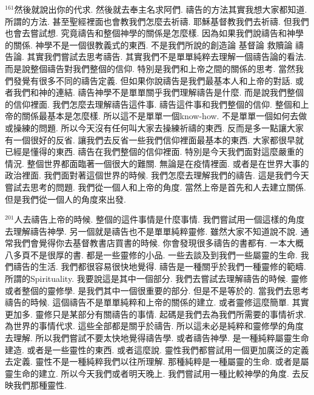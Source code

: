 \documentclass{book}
\begin{document}
$^{161}$然後就說出你的代求.
然後就去奉主名求阿們.
禱告的方法其實我想大家都知道.
所謂的方法.
甚至聖經裡面也會教我們怎麼去祈禱.
耶穌基督教我們去祈禱.
但我們也會去嘗試想.
究竟禱告和整個神學的關係是怎麼樣.
因為如果我們說禱告和神學的關係.
神學不是一個很教義式的東西.
不是我們所說的創造論 基督論 救贖論 禱告論.
其實我們嘗試去思考禱告.
其實我們不是單單純粹去理解一個禱告論的看法.
而是說整個禱告對我們整個的信仰.
特別是我們和上帝之間的關係的思考.
當然我們發覺有很多不同的禱告定義.
但如果你說禱告是我們最基本人和上帝的對話.
或者我們和神的連結.
禱告神學不是單單關乎我們理解禱告是什麼.
而是說我們整個的信仰裡面.
我們怎麼去理解禱告這件事.
禱告這件事和我們整個的信仰.
整個和上帝的關係最基本是怎麼樣.
所以這不是單單一個know-how.
不是單單一個如何去做或操練的問題.
所以今天沒有任何叫大家去操練祈禱的東西.
反而是多一點讓大家有一個很好的反省.
讓我們去反省一些我們信仰裡面最基本的東西.
大家都很早就已經是懂得的東西.
禱告在我們整個的信仰裡面.
特別是今天我們面對這麼嚴重的情況.
整個世界都面臨著一個很大的難關.
無論是在疫情裡面.
或者是在世界大事的政治裡面.
我們面對著這個世界的時候.
我們怎麼去理解我們的禱告.
這是我們今天嘗試去思考的問題.
我們從一個人和上帝的角度.
當然上帝是首先和人去建立關係.
但是我們從一個人的角度來出發.

$^{201}$人去禱告上帝的時候.
整個的這件事情是什麼事情.
我們嘗試用一個這樣的角度去理解禱告神學.
另一個就是禱告也不是單單純粹靈修.
雖然大家不知道說不說.
通常我們會覺得你去基督教書店買書的時候.
你會發現很多禱告的書都有.
一本大概八多頁不是很厚的書.
都是一些靈修的小品.
一些去談及到我們一些屬靈的生命.
我們禱告的生活.
我們都很容易很快地覺得.
禱告是一種關乎於我們一種靈修的範疇.
所謂的Spirituality.
我要說這是其中一個部分.
我們去嘗試去理解禱告的時候.
靈修或者整個的靈修學.
是我們其中一個很重要的部分.
但是不是等於的.
當我們去思考禱告的時候.
這個禱告不是單單純粹和上帝的關係的建立.
或者靈修這麼簡單.
其實更加多.
靈修只是某部分有關禱告的事情.
起碼是我們去為我們所需要的事情祈求.
為世界的事情代求.
這些全部都是關乎於禱告.
所以這未必是純粹和靈修學的角度去理解.
所以我們嘗試不要太快地覺得禱告學.
或者禱告神學.
是一種純粹屬靈生命建造.
或者是一些靈性的東西.
或者這麼說.
靈性我們都嘗試用一個更加廣泛的定義去定義.
靈性不是一種純粹我們以往所理解.
那種純粹是一種屬靈的生命.
或者是屬靈生命的建立.
所以今天我們或者明天晚上.
我們嘗試用一種比較神學的角度.
去反映我們那種靈性.
\end{document}
